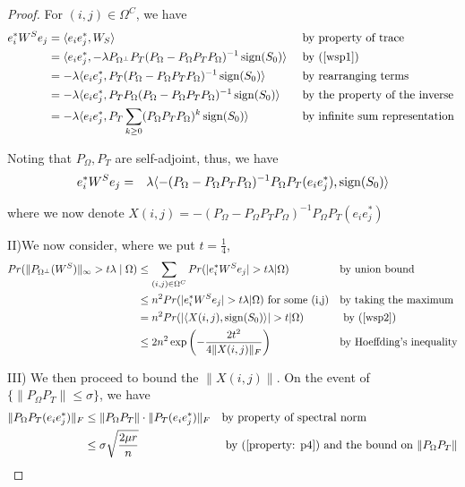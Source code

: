 \begin{proof}
For $(i,j)\in\Omega^{C}$, we have
%
\[
\begin{aligned}
e_{i}^{*}W^{S}e_{j}
& = \langle e_{i}e_{j}^{*},W_{S} \rangle
&&\text{ by property of trace}\\
& = \langle e_{i}e_{j}^{*},-\lambda P_{\Omega^{\bot}}P_{T}(P_{\Omega}-P_{\Omega}P_{T}P_{\Omega})^{-1} \operatorname{sign}(S_{0}) \rangle
&&\text{ by (\ref{wsp1})}\\
& = -\lambda \langle e_{i}e_{j}^{*},P_{T}(P_{\Omega}-P_{\Omega}P_{T}P_{\Omega})^{-1} \operatorname{sign}(S_{0}) \rangle
&&\text{ by rearranging terms}\\
& = -\lambda \langle e_{i}e_{j}^{*},P_{T}P_{\Omega}(P_{\Omega}-P_{\Omega}P_{T}P_{\Omega})^{-1} \operatorname{sign}(S_{0}) \rangle
&&\text{ by the property of the inverse }\\
& = -\lambda \langle e_{i}e_{j}^{*},P_{T}\sum_{k\ge0}(P_{\Omega}P_{T}P_{\Omega})^{k} \operatorname{sign}(S_{0}) \rangle
&&\text{ by infinite sum representation}
\end{aligned}
\]

Noting that $P_{\Omega},P_{T}$ are self-adjoint, thus, we have
\begin{eqnarray}
e_{i}^{*}W^{S}e_{j} & = & \lambda \langle-(P_{\Omega}-P_{\Omega}P_{T}P_{\Omega})^{-1}P_{\Omega}P_{T}(e_{i}e_{j}^{*}), \operatorname{sign}(S_{0}) \rangle
\label{wsp2}
\end{eqnarray}


where we now denote $X(i,j)=-(P_{\Omega}-P_{\Omega}P_{T}P_{\Omega})^{-1}P_{\Omega}P_{T}(e_{i}e_{j}^{*})$

II)We now consider, where we put $t=\frac{1}{4}$,
\[
\begin{aligned}
Pr(\|P_{\Omega^{\bot}}(W^{S})\|_{\infty}>t\lambda\mid\Omega)
& \le \sum_{(i,j)\in\Omega^{C}}Pr(|e_{i}^{*}W^{S}e_{j}|>t\lambda|\Omega)
&&\text{by union bound}\\
& \le n^{2}Pr(|e_{i}^{*}W^{S}e_{j}|>t\lambda|\Omega)\text{ for some (i,j)}
&&\text{by taking the maximum}\\
& = n^{2}Pr(| \langle X(i,j), \sign(S_{0}) \rangle|>t|\Omega)
&&\text{ by (\ref{wsp2})}\\
& \le 2n^{2}\exp \left( -\frac{2t^{2}}{4\|X(i,j)\|_{F}} \right)
&&\text{by Hoeffding's inequality}
\end{aligned}
\]

III) We then proceed to bound the $\|X(i,j)\|$. On the event of $\{\|P_{\Omega}P_{T}\|\le\sigma\}$,
we have
\[
\begin{aligned}
\|P_{\Omega}P_{T}(e_{i}e_{j}^{*})\|_{F}
& \le \|P_{\Omega}P_{T}\|\cdot\|P_{T}(e_{i}e_{j}^{*})\|_{F}
&&\text{by property of spectral norm}\\
& \le \sigma\sqrt{\frac{2\mu r}{n}}
&&\text{ by (\ref{property: p4}) and the bound on } \|P_{\Omega}P_{T}\|
\end{aligned}
\]



\end{proof}
